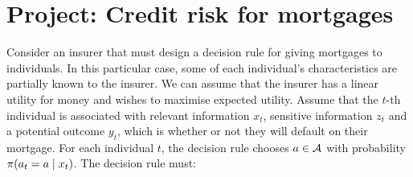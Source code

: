 \section{Project: Credit risk for mortgages}

Consider an insurer that must design a decision rule for giving mortgages to individuals. In this particular case, some of each individual's characteristics are partially known to the insurer.  We can assume that the insurer has a linear utility for money and wishes to maximise expected utility. Assume that the $t$-th individual is associated with relevant information $x_t$, sensitive information $z_t$ and a potential outcome $y_t$, which is whether or not they will default on their mortgage. For each individual $t$, the decision rule chooses $a \in {\mathcal{A}}$ with probability $\pi(a_t = a \mid x_t)$. The decision rule must:

